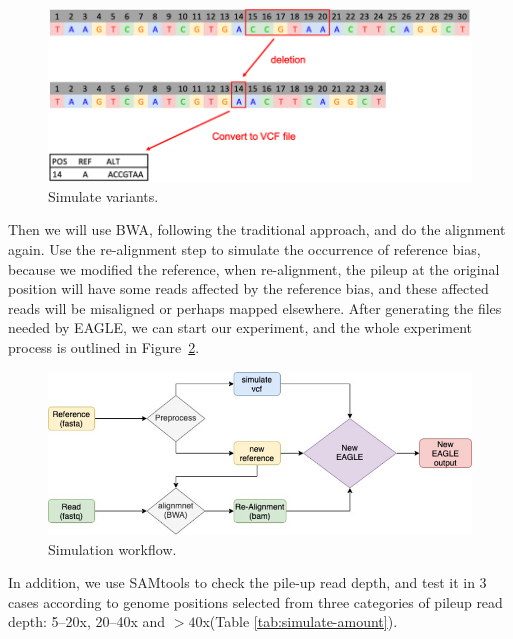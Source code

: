\begin{figure}[ht]
\vspace{1em}
\includegraphics[width=1\columnwidth]{body/image/simulate_variants.png}
\caption[Simulate variants]{Simulate variants.}
\label{simulate_variants}
\end{figure}

Then we will use BWA, following the traditional approach, and do the alignment again. Use the re-alignment step to simulate the occurrence of reference bias, because we modified the reference, when re-alignment, the pileup at the original position will have some reads affected by the reference bias, and these affected reads will be misaligned or perhaps mapped elsewhere. After generating the files needed by EAGLE, we can start our experiment, and the whole experiment process is outlined in Figure~\ref{simulation_workflow}.

\begin{figure}[ht]
\vspace{1em}
\includegraphics[width=1\columnwidth]{body/image/simulation_workflow.png}
\caption[Simulation workflow]{Simulation workflow.}
\label{simulation_workflow}
\end{figure}

In addition, we use SAMtools to check the pile-up read depth, and test it in 3 cases according to genome positions selected from three categories of pileup read depth: 5--20x, 20--40x and $>40$x(Table \ref{tab:simulate-amount}).

